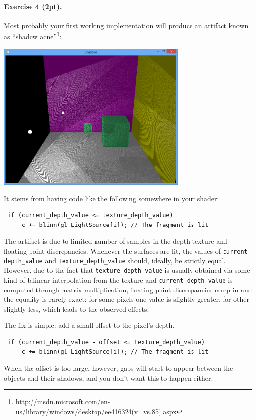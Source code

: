 \documentclass{article}
\newenvironment{exercise}[2]{\paragraph{Exercise #1 (#2pt).} }{
\medskip}
\begin{document}
\begin{exercise}{4}{2}
Most probably your first working implementation will produce an artifact known as ``shadow acne''\footnote{\url{http://msdn.microsoft.com/en-us/library/windows/desktop/ee416324(v=vs.85).aspx}}:
\begin{center}
\includegraphics[width=0.7\textwidth]{shadow_acne.png}
\end{center}
It stems from having code like the following somewhere in your shader:
\begin{verbatim}
 if (current_depth_value <= texture_depth_value)
     c += blinn(gl_LightSource[i]); // The fragment is lit
\end{verbatim}
The artifact is due to limited number of samples in the depth texture and floating point discrepancies. Whenever the surfaces are lit, the values of \verb#current_# \verb#depth_value# and \verb#texture_depth_value# should, ideally, be strictly equal. However, due to the fact that \verb#texture_depth_value# is usually obtained via some kind of bilinear interpolation from the texture and \verb#current_depth_value# is computed through matrix multiplication, floating point discrepancies creep in and the equality is rarely exact: for some pixels one value is slightly greater, for other slightly less, which leads to the observed effects.

The fix is simple: add a small offset to the pixel's depth.
\begin{verbatim}
 if (current_depth_value - offset <= texture_depth_value)
     c += blinn(gl_LightSource[i]); // The fragment is lit
\end{verbatim}

When the offset is too large, however, gaps will start to appear between the objects and their shadows, and you don't want this to happen either.
\end{exercise}
\end{document}

